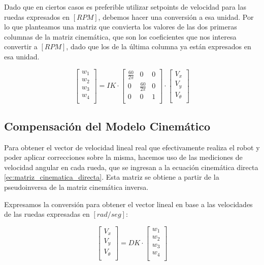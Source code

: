 Dado que en ciertos casos es preferible utilizar setpoints de velocidad para las ruedas expresados en $[RPM]$, debemos hacer una conversión a esa unidad. Por lo que planteamos una matriz que convierta los valores de las dos primeras columnas de la matriz cinemática, que son los coeficientes que nos interesa convertir a $[RPM]$, dado que los de la última columna ya están expresados en esa unidad.

\begin{equation}
	\begin{bmatrix} w_1 \\ w_2 \\ w_3 \\ w_4 \\
	\end{bmatrix} = IK \cdot
	\begin{bmatrix}
    	{\frac{60}{2 \pi}} & {0} & {0} \\
    	{0} & {\frac{60}{2 \pi}} & {0} \\
    	{0} & {0} & {1}            	\\
	\end{bmatrix} \cdot
	\begin{bmatrix} V_x \\ V_y \\ V_\theta \\
	\end{bmatrix}
\end{equation}

\subsection{Compensación del Modelo Cinemático}
Para obtener el vector de velocidad lineal real que efectivamente realiza el robot y poder aplicar correcciones sobre la misma, hacemos uso de las mediciones de velocidad angular en cada rueda, que se ingresan a la ecuación cinemática directa \ref{ec:matriz_cinematica_directa}. Esta matriz se obtiene a partir de la pseudoinversa de la matriz cinemática inversa. \cite{islassistcontrolomni}

Expresamos la conversión para obtener el vector lineal en base a las velocidades de las ruedas expresadas en $[rad/seg]$:

\begin{equation}
	\begin{bmatrix}
    	V_x \\ V_y \\ V_\theta \\
	\end{bmatrix} = DK \cdot
	\begin{bmatrix}
    	w_1 \\ w_2 \\ w_3 \\ w_4 \\
	\end{bmatrix}
	\label{ec:matriz_cinematica_directa}
\end{equation}


